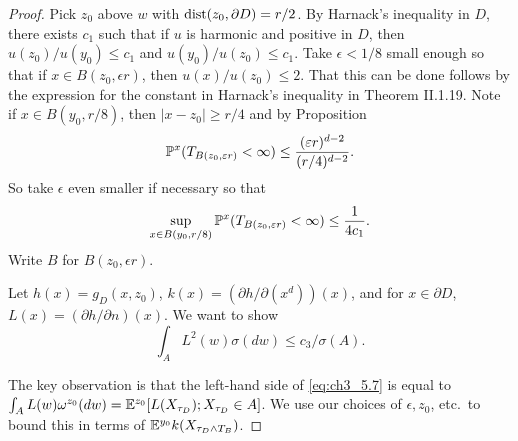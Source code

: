 \begin{proof}
Pick $z_0$ above $w$ with $\dist(z_0,\partial D) = r/2$. By Harnack's inequality in $D$, there exists $c_1$ such that if $u$ is harmonic and positive in $D$, then $u(z_0)/u(y_0) \leq c_1$ and $u(y_0)/u(z_0) \leq c_1$. Take $\epsilon < 1/8$ small enough so that if $x \in B(z_0,\epsilon r)$, then $u(x)/u(z_0) \leq 2$. That this can be done follows by the expression for the constant in Harnack's inequality in Theorem II.1.19. Note if $x \in B(y_0,r/8)$, then $|x - z_0| \geq r/4$ and by Proposition 
\[
    \P^x(T_{B(z_0,\epsilon r)} < \infty) \leq \frac{(\epsilon r)^{d-2}}{(r/4)^{d-2}}.
\]
So take $\epsilon$ even smaller if necessary so that
\[
    \sup_{x\in B(y_0,r/8)} \P^x(T_{B(z_0,\epsilon r)} < \infty) \leq \frac{1}{4c_1}.
\]
Write $B$ for $B(z_0,\epsilon r)$.

Let $h(x) = g_D(x,z_0)$, $k(x) = (\partial h/\partial(x^d))(x)$, and for $x \in \partial D$, $L(x) = (\partial h/\partial n)(x)$. We want to show
\begin{equation}\label{eq:ch3_5.7}
    \int_A L^2(w)\sigma(dw) \leq c_3/\sigma(A).
\end{equation}

The key observation is that the left-hand side of \eqref{eq:ch3_5.7} is equal to $\int_A L(w)\omega^{z_0}(dw) = \E^{z_0}[L(X_{\tau_D}); X_{\tau_D} \in A]$. We use our choices of $\epsilon,z_0$, etc.\ to bound this in terms of $\E^{y_0}k(X_{\tau_D \wedge T_B})$.


\end{proof}

